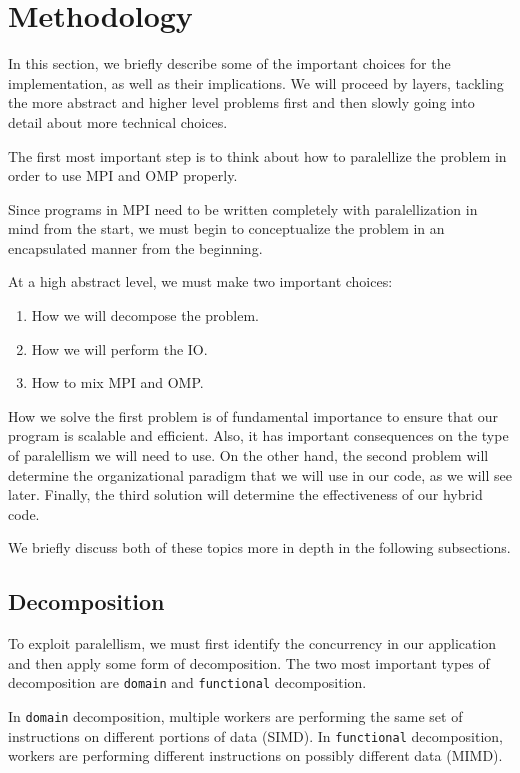 \documentclass{report}
\begin{document}
\section{Methodology}

In this section, we briefly describe some of the important choices for the 
implementation, as well as their implications. We will proceed by layers, 
tackling the more abstract and higher level problems first and then slowly 
going into detail about more technical choices. 

The first most important step is to think about how to paralellize the problem 
in order to use MPI and OMP properly.

Since programs in MPI need to be written completely with paralellization in mind 
from the start, we must begin to conceptualize the problem in an encapsulated 
manner from the beginning.

At a high abstract level, we must make two important choices: 

\begin{enumerate}
    \item How we will decompose the problem. 
    \item How we will perform the IO. 
    \item How to mix MPI and OMP.
\end{enumerate}

How we solve the first problem is of fundamental importance to ensure that our 
program is scalable and efficient. Also, it has important consequences on the 
type of paralellism we will need to use. 
On the other hand, the second problem will determine the organizational paradigm 
that we will use in our code, as we will see later.
Finally, the third solution will determine the effectiveness of our hybrid code.

We briefly discuss both of these topics more in depth in the following 
subsections.

\subsection{Decomposition}

To exploit paralellism, we must first identify the concurrency in our 
application and then apply some form of decomposition. The two most important 
types of decomposition are \texttt{domain} and \texttt{functional} decomposition. 

In \texttt{domain} decomposition, multiple workers are performing the same set of 
instructions on different portions of data (SIMD). In \texttt{functional} 
decomposition, workers are performing different instructions on possibly 
different data (MIMD). 
 
\end{document}
